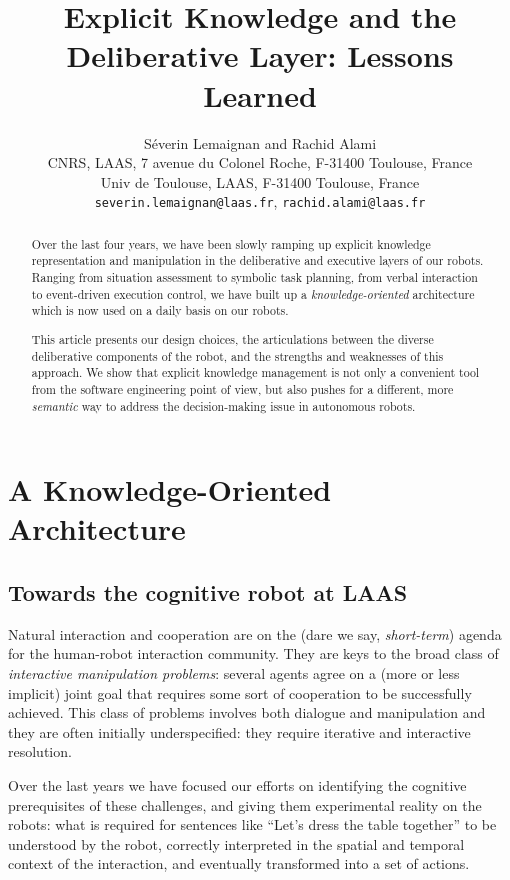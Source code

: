 \documentclass[letterpaper, 10 pt, conference]{ieeeconf}  %
\title{\LARGE \bf
Explicit Knowledge and the Deliberative Layer: Lessons Learned
}
\author{Séverin Lemaignan and Rachid Alami\\
CNRS, LAAS, 7 avenue du Colonel Roche, F-31400 Toulouse, France\\
Univ de Toulouse, LAAS, F-31400 Toulouse, France\\
{\tt severin.lemaignan@laas.fr}, {\tt rachid.alami@laas.fr}
}
\begin{document}
\maketitle
\thispagestyle{empty}
\pagestyle{empty}


\begin{abstract}

Over the last four years, we have been slowly ramping up explicit knowledge
representation and manipulation in the deliberative and executive layers of our
robots. Ranging from situation assessment to symbolic task planning, from
verbal interaction to event-driven execution control, we have built up a
\emph{knowledge-oriented} architecture which is now used on a daily basis on our
robots.

This article presents our design choices, the articulations between the diverse
deliberative components of the robot, and the strengths and weaknesses of this
approach. We show that explicit knowledge management is not only a convenient
tool from the software engineering point of view, but also pushes for a
different, more \emph{semantic} way to address the decision-making issue in
autonomous robots.

\end{abstract}


\section{A Knowledge-Oriented Architecture}

\subsection{Towards the cognitive robot at LAAS}

Natural interaction and cooperation are on the (dare we say,
\emph{short-term}) agenda for the human-robot interaction community. They are
keys to the broad class of \emph{interactive manipulation problems}: several
agents agree on a (more or less implicit) joint goal that requires some sort of
cooperation to be successfully achieved. This class of problems involves both
dialogue and manipulation and they are often initially underspecified: they
require iterative and interactive resolution.

Over the last years we have focused our efforts on identifying the cognitive
prerequisites of these challenges, and giving them experimental reality on the
robots: what is required for sentences like ``Let's dress the table together''
to be understood by the robot, correctly interpreted in the spatial and
temporal context of the interaction, and eventually transformed into a set of
actions.
\end{document}

